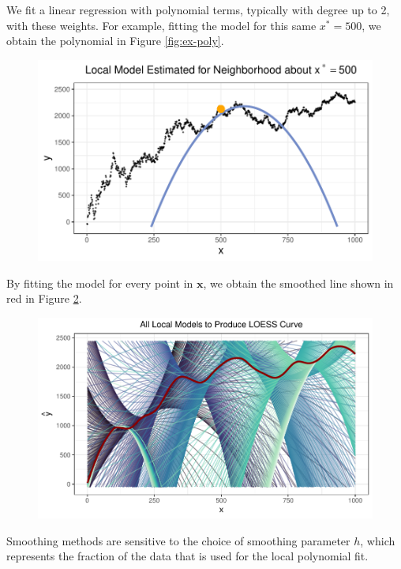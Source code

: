 \documentclass[12pt,twoside]{smiththesis}
\begin{document}
We fit a linear regression with polynomial terms, typically with degree up to 2, with these weights. For example, fitting the model for this same \(x^*=500\), we obtain the polynomial in Figure \ref{fig:ex-poly}.
\begin{flushleft}
\begin{figure}

{\centering \includegraphics[width=1\linewidth]{thesis_files/figure-latex/unnamed-chunk-32-1} 

}

\caption{\label{fig:ex-poly}}\label{fig:unnamed-chunk-32}
\end{figure}
\end{flushleft}
By fitting the model for every point in \(\mathbf x\), we obtain the smoothed line shown in red in Figure \ref{fig:loess-all}.
\begin{figure}

{\centering \includegraphics[width=1\linewidth]{thesis_files/figure-latex/loess-all-1} 

}

\caption{\label{loess-all}}\label{fig:loess-all}
\end{figure}
Smoothing methods are sensitive to the choice of smoothing parameter \(h\), which represents the fraction of the data that is used for the local polynomial fit.
\end{document}
